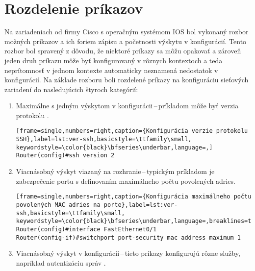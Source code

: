 \section{Rozdelenie príkazov}
Na zariadeniach od firmy Cisco s operačným systémom IOS bol vykonaný rozbor možných príkazov a ich foriem zápisu a početnosti výskytu v konfigurácií. Tento rozbor bol spravený z dôvodu, že niektoré príkazy sa môžu opakovať a zároveň jeden druh príkazu môže byť konfigurovaný v rôznych kontextoch a teda neprítomnosť v jednom kontexte automaticky neznamená nedostatok v konfigurácií. Na základe rozboru boli rozdelené príkazy na konfiguráciu sieťových zariadení do nasledujúcich štyroch kategórií:
\\
\begin{enumerate}
	\item Maximálne s jedným výskytom v konfigurácii\,--\,príkladom môže byť verzia protokolu .
	
\begin{minipage}{\linewidth}		
\begin{lstlisting}[frame=single,numbers=right,caption={Konfigurácia verzie protokolu SSH},label=lst:ver-ssh,basicstyle=\ttfamily\small, keywordstyle=\color{black}\bfseries\underbar,language=,]
Router(config)#ssh version 2
\end{lstlisting}
\end{minipage}
	
	\item \vspace{2em} Viacnásobný výskyt viazaný na rozhranie\,--\,typickým príkladom je zabezpečenie portu s definovaním maximálneho počtu povolených  adries.
	
\begin{minipage}{\linewidth}		
\begin{lstlisting}[frame=single,numbers=right,caption={Konfigurácia maximálneho počtu povolených MAC adries na porte},label=lst:ver-ssh,basicstyle=\ttfamily\small, keywordstyle=\color{black}\bfseries\underbar,language=,breaklines=true]
Router(config)#interface FastEthernet0/1
Router(config-if)#switchport port-security mac address maximum 1
\end{lstlisting}
\end{minipage}

	\item \vspace{2em} Viacnásobný výskyt v konfigurácii\,--\,tieto príkazy konfigurujú rôzne služby, napríklad autentizáciu správ .


\end{enumerate}
